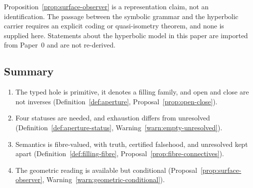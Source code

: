\begin{warning}\label{warn:geometric-conditional}
Proposition~\ref{prop:surface-observer} is a representation claim, not an identification.
The passage between the symbolic grammar and the hyperbolic carrier requires an explicit
coding or quasi-isometry theorem, and none is supplied here.  Statements about the
hyperbolic model in this paper are imported from Paper~0 \cite{Yuan2026AEGPaperZero} and
are not re-derived.
\end{warning}

\subsection{Summary}

\begin{enumerate}
\item The typed hole is primitive, it denotes a filling family, and open and close are not
  inverses (Definition~\ref{def:aperture}, Proposal~\ref{prop:open-close}).
\item Four statuses are needed, and exhaustion differs from unresolved
  (Definition~\ref{def:aperture-status}, Warning~\ref{warn:empty-unresolved}).
\item Semantics is fibre-valued, with truth, certified falsehood, and unresolved kept
  apart (Definition~\ref{def:filling-fibre}, Proposal~\ref{prop:fibre-connectives}).
\item The geometric reading is available but conditional
  (Proposal~\ref{prop:surface-observer}, Warning~\ref{warn:geometric-conditional}).
\end{enumerate}
